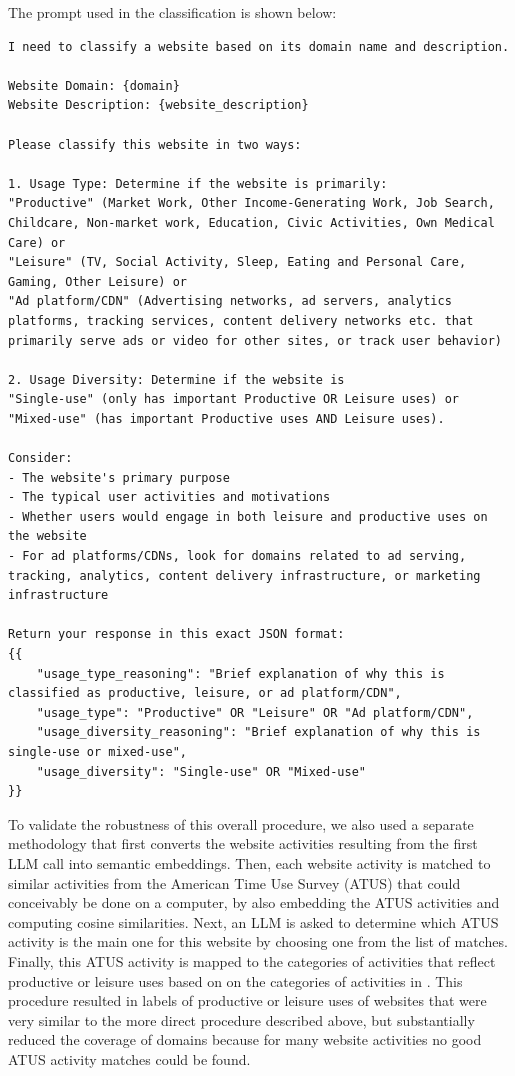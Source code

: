 \documentclass[12pt]{article}
\begin{document}
The prompt used in the classification is shown below: 
\tiny{
\begin{verbatim}
I need to classify a website based on its domain name and description.

Website Domain: {domain}
Website Description: {website_description}

Please classify this website in two ways:

1. Usage Type: Determine if the website is primarily:
"Productive" (Market Work, Other Income-Generating Work, Job Search, Childcare, Non-market work, Education, Civic Activities, Own Medical Care) or
"Leisure" (TV, Social Activity, Sleep, Eating and Personal Care, Gaming, Other Leisure) or
"Ad platform/CDN" (Advertising networks, ad servers, analytics platforms, tracking services, content delivery networks etc. that primarily serve ads or video for other sites, or track user behavior)

2. Usage Diversity: Determine if the website is
"Single-use" (only has important Productive OR Leisure uses) or
"Mixed-use" (has important Productive uses AND Leisure uses).

Consider:
- The website's primary purpose
- The typical user activities and motivations
- Whether users would engage in both leisure and productive uses on the website
- For ad platforms/CDNs, look for domains related to ad serving, tracking, analytics, content delivery infrastructure, or marketing infrastructure

Return your response in this exact JSON format:
{{
    "usage_type_reasoning": "Brief explanation of why this is classified as productive, leisure, or ad platform/CDN",
    "usage_type": "Productive" OR "Leisure" OR "Ad platform/CDN",
    "usage_diversity_reasoning": "Brief explanation of why this is single-use or mixed-use",
    "usage_diversity": "Single-use" OR "Mixed-use"
}}
\end{verbatim}}

To validate the robustness of this overall procedure, we also used a separate methodology that first converts the website activities resulting from the first LLM call into semantic embeddings. Then, each website activity is matched to similar activities from the American Time Use Survey (ATUS) that could conceivably be done on a computer, by also embedding the ATUS activities and computing cosine similarities. Next, an LLM is asked to determine which ATUS activity is the main one for this website by choosing  one from the list of matches. Finally, this ATUS activity is mapped to the categories of activities that reflect productive or leisure uses based on on the categories of activities in \cite{aguiar2013}. This procedure resulted in labels of productive or leisure uses of websites that were very similar to the more direct procedure described above, but substantially reduced the coverage of domains because for many website activities no good ATUS activity matches could be found.
\end{document}

